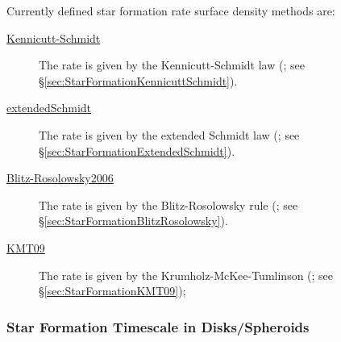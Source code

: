 Currently defined star formation rate surface density methods are:
\begin{description}
 \item [\hyperlink{star_formation.rate_surface_density.disks.Kennicutt-Schmidt.F90:star_formation_rate_surface_density_disks_ks:star_formation_rate_surface_density_disk_ks}{{\normalfont \ttfamily Kennicutt-Schmidt}}] The rate is given by the Kennicutt-Schmidt law (\citealt{schmidt_rate_1959,kennicutt_global_1998}; see \S\ref{sec:StarFormationKennicuttSchmidt}).
 \item [\hyperlink{star_formation.rate_surface_density.disks.extended_Schmidt.F90:star_formation_rate_surface_density_disks_exschmidt:star_formation_rate_surface_density_disk_exschmidt}{{\normalfont \ttfamily extendedSchmidt}}] The rate is given by the extended Schmidt law (\citealt{shi_extended_2011}; see \S\ref{sec:StarFormationExtendedSchmidt}).
 \item [\hyperlink{star_formation.rate_surface_density.disks.Blitz-Rosolowsky.F90:star_formation_rate_surface_density_disks_br:star_formation_rate_surface_density_disk_br}{{\normalfont \ttfamily Blitz-Rosolowsky2006}}] The rate is given by the Blitz-Rosolowsky rule (\citealt{blitz_role_2006}; see \S\ref{sec:StarFormationBlitzRosolowsky}).
 \item [\hyperlink{star_formation.rate_surface_density.disks.KMT09.F90:star_formation_rate_surface_density_disks_kmt09:star_formation_rate_surface_density_disk_kmt09}{{\normalfont \ttfamily KMT09}}] The rate is given by the Krumholz-McKee-Tumlinson (\citealt{krumholz_star_2009}; see \S\ref{sec:StarFormationKMT09});
\end{description}

\subsubsection{Star Formation Timescale in Disks/Spheroids}


